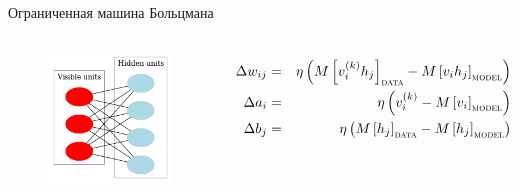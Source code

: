 \documentclass[10pt]{beamer}
\begin{document}
\begin{frame}{Ограниченная машина Больцмана}

\begin{columns}
	
	\begin{figure}[h!]
		\centering
  		\includegraphics[width=1\textwidth]{images/rbm_graph.png}
	\end{figure} 
    
	
	\begin{eqnarray*}
		\Delta w_{ij} &=& \eta\left( M\left[v_i^{(k)} h_j \right]_{\textsc{data}} - M\left[v_i h_j\right]_{\textsc{model}} \right) \\
		\Delta a_i &=& \eta\left( v_i^{(k)} - M\left[v_i\right]_{\textsc{model}} \right) \\
		\Delta b_j &=& \eta\left( M\left[h_j \right]_{\textsc{data}} - M\left[h_j\right]_{\textsc{model}} \right)
	\end{eqnarray*}
\end{columns}

\end{frame}
\end{document}
